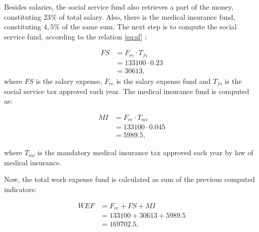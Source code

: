 \documentclass[12pt,a4paper,titlepage]{article}
\begin{document}
\begin{table}[H]
\centering
\caption{Salary expenses}
\label{table:salaries}
\end{table}

Besides salaries, the social service fund also retrieves a part of the money, constituting $23\%$ of total  salary. Also, there is the medical insurance fund, constituting $4,5\%$ of the same sum. The next step is to compute the social service fund, according to the relation \eqref{eq:sf} :

\begin{equation}
\label{eq:sf}
\begin{split}
 FS &= F_{re} \cdot T_{fs} \\
    &= 133100 \cdot 0.23  \\
    &= 30613,
\end{split}
\end{equation}
\noindent
where $FS$ is the salary expense, $F_{re}$ is the salary expense fund and $T_{fs}$ is the social service tax approved each year. The medical insurance fund is computed as:

\begin{equation}
\begin{split}
 MI &= F_{re} \cdot T_{mi}\\ 
    &= 133100 \cdot 0.045 \\ 
    &= 5989.5,
 \end{split}
\end{equation}

\noindent
where $T_{mi}$ is the mandatory medical insurance tax approved each year by law of medical insurance.

Now, the total work expense fund is calculated as sum of the previous computed indicators:

\begin{equation}
\begin{split}
 WEF &= F_{re} + FS + MI\\
     &= 133100 + 30613 + 5989.5 \\
     &= 169702.5,
\end{split}
\end{equation}
\end{document}
